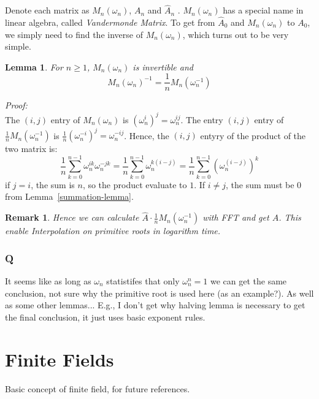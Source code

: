 \documentclass[10pt]{article}
\newtheorem{lemma}{Lemma}
\newtheorem{remark}{Remark}
\begin{document}
Denote each matrix as $M_n(\omega_n)$, $A_n$ and $\hat{A}_n$ . $M_n(\omega_n)$ has a
special name in linear algebra, called \emph{Vandermonde Matrix}.
To get from $\hat{A}_0$ and $M_n(\omega_n)$ to $A_0$, we simply need to find
the inverse of $M_n(\omega_n)$, which turns out to be very simple.

\begin{lemma}
    For $n \geq 1$, $M_n(\omega_n)$ is invertible and
    \[
        M_n(\omega_n)^{-1} = \frac{1}{n}M_n(\omega^{-1}_n)
    \]
\end{lemma}

\emph{Proof:}\\
The $(i, j)$ entry of $M_n(\omega_n)$ is $(\omega^{i}_n)^j = \omega^{ij}_n$. 
The entry $(i, j)$ entry of $\frac{{1}}{n}M_n(\omega^{-1}_n)$ is
$\frac{1}{n}(\omega^{-i}_n)^j = \omega^{-ij}_n$. 
Hence, the $(i, j)$ entyry of the product of the two matrix is:
\[
    \frac{1}{n}\sum^{n-1}_{k=0}\omega^{ik}_n\omega^{-jk}_n = 
    \frac{1}{n}\sum^{n-1}_{k=0}\omega^{k(i - j)}_n=
    \frac{1}{n}\sum^{n-1}_{k=0}{(\omega^{(i - j)}_n)}^k
\]
if $j = i$, the sum is $n$, so the product evaluate to $1$. If $i \neq j$, the
sum must be $0$ from Lemma~\ref{summation-lemma}.

\begin{remark}
    Hence we can calculate $\hat{A} \cdot \frac{1}{n}M_n(\omega^{-1}_n)$ with
    FFT and get $A$. This enable Interpolation on primitive roots in logarithm
    time.
\end{remark}

\subsubsection{Q}
It seems like as long as $\omega_n$ statistifes that only $\omega^n_n = 1$ we
can get the same conclusion, not sure why the primitive root is used here (as
an example?). As well as some other lemmas... E.g., I don't get why halving
lemma is necessary to get the final conclusion, it just uses basic exponent
rules.

\section{Finite Fields}
Basic concept of finite field, for future references.
\end{document}
